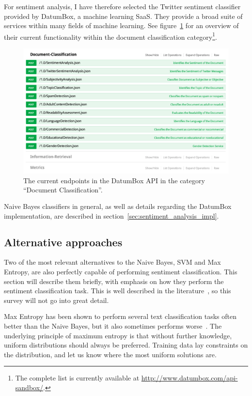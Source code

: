 For sentiment analysis, I have therefore selected the Twitter sentiment classifier provided by DatumBox, a machine learning SaaS. They provide a broad suite of services within many fields of machine learning. See figure~\ref{fig:datumbox_api} for an overview of their current functionality within the document classification category\footnote{The complete list is currently available at \url{http://www.datumbox.com/api-sandbox/}.}.

\begin{figure}[h]
  \centering
    \includegraphics[width=\textwidth]{Figures/datumbox_api}
  \caption{The current endpoints in the DatumBox API in the category ``Document Classification''.}
  \label{fig:datumbox_api}
\end{figure}

Naive Bayes classifiers in general, as well as details regarding the DatumBox implementation, are described in section~\ref{sec:sentiment_analysis_impl}.

\subsection{Alternative approaches}

Two of the most relevant alternatives to the Naive Bayes, SVM and Max Entropy, are also perfectly capable of performing sentiment classification. This section will describe them briefly, with emphasis on how they perform the sentiment classification task. This is well described in the literature~\cite{pang2002thumbs}, so this survey will not go into great detail.

Max Entropy has been shown to perform several text classification tasks often better than the Naive Bayes, but it also sometimes performs worse~\cite{Nigam99usingmaximum}. The underlying principle of maximum entropy is that without further knowledge, uniform distributions should always be preferred. Training data lay constraints on the distribution, and let us know where the most uniform solutions are.

